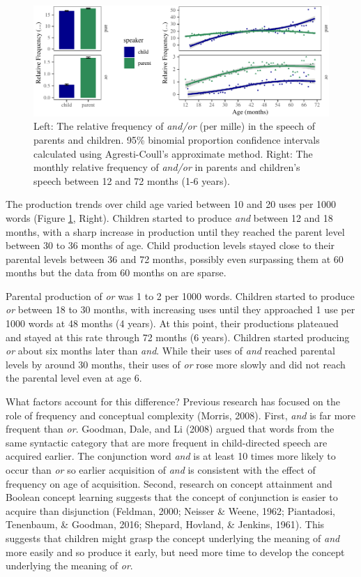 \documentclass[
  english,
  ,man,floatsintext]{apa6}
\begin{document}
\begin{figure}[tb]

{\centering \includegraphics{figs/freqPlots-1} 

}

\caption{Left: The relative frequency of \textit{and/or} (per mille) in the speech of parents and children. 95\% binomial proportion confidence intervals calculated using Agresti-Coull's approximate method. Right: The monthly relative frequency of \textit{and/or} in parents and children's speech between 12 and 72 months (1-6 years).}\label{fig:freqPlots}
\end{figure}

The production trends over child age varied between 10 and 20 uses per 1000 words (Figure \ref{fig:freqPlots}, Right). Children started to produce \emph{and} between 12 and 18 months, with a sharp increase in production until they reached the parent level between 30 to 36 months of age. Child production levels stayed close to their parental levels between 36 and 72 months, possibly even surpassing them at 60 months but the data from 60 months on are sparse.

Parental production of \emph{or} was 1 to 2 per 1000 words. Children started to produce \emph{or} between 18 to 30 months, with increasing uses until they approached 1 use per 1000 words at 48 months (4 years). At this point, their productions plateaued and stayed at this rate through 72 months (6 years). Children started producing \emph{or} about six months later than \emph{and}. While their uses of \emph{and} reached parental levels by around 30 months, their uses of \emph{or} rose more slowly and did not reach the parental level even at age 6.

What factors account for this difference? Previous research has focused on the role of frequency and conceptual complexity (Morris, 2008). First, \emph{and} is far more frequent than \emph{or}. Goodman, Dale, and Li (2008) argued that words from the same syntactic category that are more frequent in child-directed speech are acquired earlier. The conjunction word \emph{and} is at least 10 times more likely to occur than \emph{or} so earlier acquisition of \emph{and} is consistent with the effect of frequency on age of acquisition. Second, research on concept attainment and Boolean concept learning suggests that the concept of conjunction is easier to acquire than disjunction (Feldman, 2000; Neisser \& Weene, 1962; Piantadosi, Tenenbaum, \& Goodman, 2016; Shepard, Hovland, \& Jenkins, 1961). This suggests that children might grasp the concept underlying the meaning of \emph{and} more easily and so produce it early, but need more time to develop the concept underlying the meaning of \emph{or}.
\end{document}
